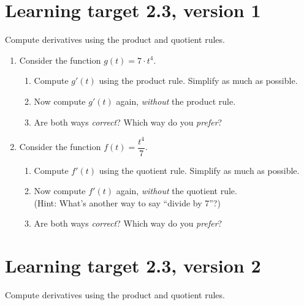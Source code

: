 
\usepackage{pgfplots}

\everymath{\displaystyle}


\section{Learning target 2.3, version 1}

Compute derivatives using the product and quotient rules.

\hrulefill

\begin{enumerate}[leftmargin=15pt]
    \item Consider the function $g(t) = 7\cdot t^4$.
    \begin{enumerate}
        \item Compute $g'(t)$ using the product rule. Simplify as much as possible.
        \vfill
        \item Now compute $g'(t)$ again, \textit{without} the product rule.
        \vfill
        \item Are both ways \textit{correct}? Which way do you \textit{prefer}?
        \vfill
    \end{enumerate}
    \item Consider the function $f(t) = \dfrac{t^4}{7}$. 

    \begin{enumerate}
        \item Compute $f'(t)$ using the quotient rule. Simplify as much as possible.
        \vfill
        \item Now compute $f'(t)$ again, \textit{without} the quotient rule.\\
        (Hint: What's another way to say ``divide by 7''?)
        \vfill
        \item Are both ways \textit{correct}? Which way do you \textit{prefer}?
    \end{enumerate}
\end{enumerate}



\pagebreak

\section{Learning target 2.3, version 2}

Compute derivatives using the product and quotient rules.

